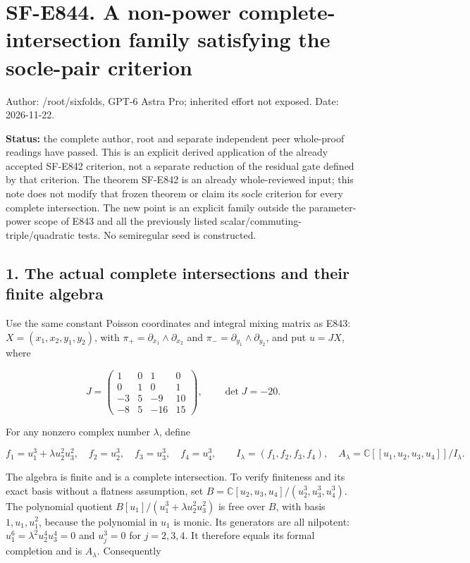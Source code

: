 \section{SF-E844. A non-power complete-intersection family satisfying the socle-pair criterion}\label{SF-E844:sf-e844.-a-non-power-complete-intersection-family-satisfying-the-socle-pair-criterion}

Author: /root/sixfolds, GPT-6 Astra Pro; inherited effort not exposed.
Date: 2026-11-22.

\textbf{Status:} the complete author, root and separate independent peer whole-proof readings have passed. This is an explicit derived application of the already accepted SF-E842 criterion, not a separate reduction of the residual gate defined by that criterion.
The theorem SF-E842 is an already whole-reviewed input; this note does not
modify that frozen theorem or claim its socle criterion for every complete
intersection. The new point is an explicit family outside the parameter-power
scope of E843 and all the previously listed scalar/commuting-triple/quadratic
tests. No semiregular seed is constructed.

\subsection{1. The actual complete intersections and their finite algebra}\label{SF-E844:the-actual-complete-intersections-and-their-finite-algebra}

Use the same constant Poisson coordinates and integral mixing matrix as E843:
\(X=(x_1,x_2,y_1,y_2)\), with
\(\pi_+=\partial_{x_1}\wedge\partial_{x_2}\) and
\(\pi_-=\partial_{y_1}\wedge\partial_{y_2}\), and put \(u=JX\), where

\[
 J=\begin{pmatrix}
 1&0&1&0\\
 0&1&0&1\\
 -3&5&-9&10\\
 -8&5&-16&15
 \end{pmatrix},\qquad \det J=-20.
 \tag{E844.1}
\]

For any nonzero complex number \(\lambda\), define

\[
 f_1=u_1^3+\lambda u_2^2u_3^2,\quad
 f_2=u_2^3,\quad f_3=u_3^3,\quad f_4=u_4^3,\qquad
 I_\lambda=(f_1,f_2,f_3,f_4),\quad
 A_\lambda=\mathbb C[[u_1,u_2,u_3,u_4]]/I_\lambda.
 \tag{E844.2}
\]

The algebra is finite and is a complete intersection. To verify finiteness
and its exact basis without a flatness assumption, set
\(B=\mathbb C[u_2,u_3,u_4]/(u_2^3,u_3^3,u_4^3)\).
The polynomial quotient
\(B[u_1]/(u_1^3+\lambda u_2^2u_3^2)\) is free over \(B\), with basis
\(1,u_1,u_1^2\), because the polynomial in \(u_1\) is monic.
Its generators are all nilpotent:
\(u_1^6=\lambda^2u_2^4u_3^4=0\) and \(u_j^3=0\) for \(j=2,3,4\).
It therefore equals its formal completion and is \(A_\lambda\).
Consequently

